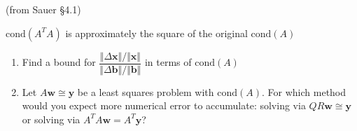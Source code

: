 \documentclass[12pt,letterpaper,noanswers]{exam}
\newcommand{\vc}[1]{\boldsymbol{#1}}
\begin{document}
\begin{tcolorbox}
(from Sauer \S 4.1)

 $\text{cond}(A^TA)$ is approximately the square of the original $\text{cond}(A)$
\end{tcolorbox}

\begin{enumerate}[resume=classQ]
\item  Find a bound for $ \dfrac{\Vert \Delta \vc{x}\Vert/\Vert\vc{x}\Vert}{\Vert \Delta \vc{b}\Vert/\Vert\vc{b}\Vert}$ in terms of $\text{cond}(A)$
\vfill

\item Let $A\vc{w} \cong \vc{y}$ be a least squares problem with $\text{cond}(A)$.  For which method would you expect more numerical error to accumulate: solving via $QR\vc{w} \cong \vc{y}$ or solving via $A^TA\vc{w} =A^T\vc{y}$?
\vfill

\end{enumerate}






\end{document}

